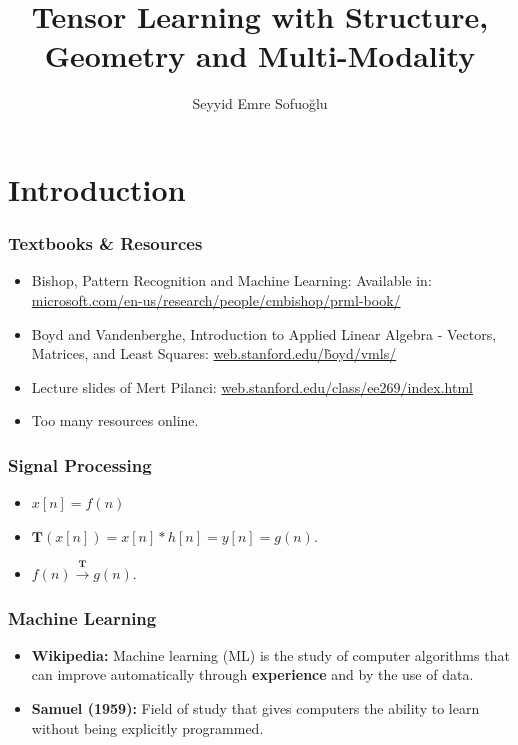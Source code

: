 \documentclass[a4,xcolor=dvipsnames]{beamer}
\title{Tensor Learning with Structure, Geometry and Multi-Modality}
\author{Seyyid Emre Sofuo\u{g}lu}
\begin{document}
\setlength{\leftmargini}{0.2cm}

\begin{frame}
    \titlepage
\end{frame}

\section{Introduction}
\begin{frame}
    \frametitle{Textbooks \& Resources}
    \begin{itemize}
        \item Bishop, Pattern Recognition and Machine Learning: Available in: \scriptsize{\textcolor{blue}{\href{https://www.microsoft.com/en-us/research/people/cmbishop/prml-book/}{microsoft.com/en-us/research/people/cmbishop/prml-book/}}}
        \normalsize
        \item Boyd and Vandenberghe, Introduction to Applied Linear Algebra - Vectors, Matrices, and Least Squares: \textcolor{blue}{\href{https://web.stanford.edu/~boyd/vmls/}{web.stanford.edu/\~boyd/vmls/}}
        \item Lecture slides of Mert Pilanci: \textcolor{blue}{\href{http://web.stanford.edu/class/ee269/index.html}{web.stanford.edu/class/ee269/index.html}}
        \item Too many resources online.
    \end{itemize}
\end{frame}

\begin{frame}
    \frametitle{Signal Processing}

    \begin{itemize}
        \item $x[n] = f(n)$
        \item $\mathbf{T}\left(x[n]\right) = x[n]\ast h[n] = y[n] = g(n)$.
        \item $f(n) \xrightarrow{\mathbf{T}} g(n)$.
    \end{itemize}

\end{frame}

\begin{frame}
    \frametitle{Machine Learning}
    \begin{itemize}
        \item \textbf{Wikipedia:} Machine learning (ML) is the study of computer algorithms that can improve automatically through \textbf{experience} and by the use of data.
        \item \textbf{Samuel (1959):} Field of study that gives computers
        the ability to learn without being explicitly programmed.
    \end{itemize}   
\end{frame}
\end{document}
